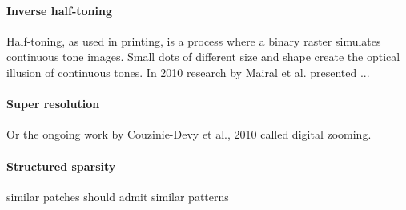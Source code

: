 
\paragraph{Inverse half-toning} Half-toning, as used in printing, is a process
where a binary raster simulates continuous tone images. Small dots of different
size and shape create the optical illusion of continuous tones. In 2010 research
by Mairal et al.\cite{Mairal2010b} presented ...


\paragraph{Super resolution} \cite{Wright2008,Yang2010, Yang2010}  
Or the ongoing work by Couzinie-Devy et al., 2010 called digital zooming.


\paragraph{Structured sparsity}
similar patches should admit similar patterns \cite{Mairal2009} 
\cite{group sparsity}








